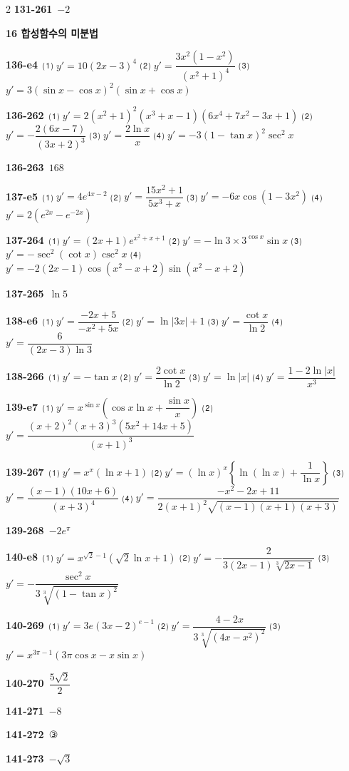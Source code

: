 \documentclass[10pt,a4paper]{article}
\begin{document}
\begin{multicols}{2}
\noindent\textbf{131-261}\ $-2$\par
\noindent\textbf{16 합성함수의 미분법}\par\smallskip
\noindent\textbf{136-e4}\ ⑴ $y'=10(2x-3)^4$ ⑵ $y'=\dfrac{3x^2(1-x^2)}{(x^2+1)^4}$ ⑶ $y'=3(\sin x-\cos x)^2(\sin x+\cos x)$\par
\noindent\textbf{136-262}\ ⑴ $y'=2(x^2+1)^2(x^3+x-1)(6x^4+7x^2-3x+1)$ ⑵ $y'=-\dfrac{2(6x-7)}{(3x+2)^3}$ ⑶ $y'=\dfrac{2\ln x}{x}$ ⑷ $y'=-3(1-\tan x)^2\sec^2 x$\par
\noindent\textbf{136-263}\ $168$\par
\noindent\textbf{137-e5}\ ⑴ $y'=4e^{4x-2}$ ⑵ $y'=\dfrac{15x^2+1}{5x^3+x}$ ⑶ $y'=-6x\cos(1-3x^2)$ ⑷ $y'=2(e^{2x}-e^{-2x})$\par
\noindent\textbf{137-264}\ ⑴ $y'=(2x+1)e^{x^2+x+1}$ ⑵ $y'=-\ln 3\times 3^{\cos x}\sin x$ ⑶ $y'=-\sec^2(\cot x)\csc^2 x$ ⑷ $y'=-2(2x-1)\cos(x^2-x+2)\sin(x^2-x+2)$\par
\noindent\textbf{137-265}\ $\ln 5$\par
\noindent\textbf{138-e6}\ ⑴ $y'=\dfrac{-2x+5}{-x^2+5x}$ ⑵ $y'=\ln|3x|+1$ ⑶ $y'=\dfrac{\cot x}{\ln 2}$ ⑷ $y'=\dfrac{6}{(2x-3)\ln 3}$\par
\noindent\textbf{138-266}\ ⑴ $y'=-\tan x$ ⑵ $y'=\dfrac{2\cot x}{\ln 2}$ ⑶ $y'=\ln|x|$ ⑷ $y'=\dfrac{1-2\ln|x|}{x^3}$\par
\noindent\textbf{139-e7}\ ⑴ $y'=x^{\sin x}\left(\cos x\ln x+\dfrac{\sin x}{x}\right)$ ⑵ $y'=\dfrac{(x+2)^2(x+3)^3(5x^2+14x+5)}{(x+1)^3}$\par
\noindent\textbf{139-267}\ ⑴ $y'=x^x(\ln x+1)$ ⑵ $y'=(\ln x)^x\left\{\ln(\ln x)+\dfrac{1}{\ln x}\right\}$ ⑶ $y'=\dfrac{(x-1)(10x+6)}{(x+3)^4}$ ⑷ $y'=\dfrac{-x^2-2x+11}{2(x+1)^2\sqrt{(x-1)(x+1)(x+3)}}$\par
\noindent\textbf{139-268}\ $-2e^{\pi}$\par
\noindent\textbf{140-e8}\ ⑴ $y'=x^{\sqrt{2}-1}(\sqrt{2}\ln x+1)$ ⑵ $y'=-\dfrac{2}{3(2x-1)\sqrt[3]{2x-1}}$ ⑶ $y'=-\dfrac{\sec^2 x}{3\sqrt[3]{(1-\tan x)^2}}$\par
\noindent\textbf{140-269}\ ⑴ $y'=3e(3x-2)^{e-1}$ ⑵ $y'=\dfrac{4-2x}{3\sqrt[3]{(4x-x^2)^2}}$ ⑶ $y'=x^{3\pi-1}(3\pi\cos x-x\sin x)$\par
\noindent\textbf{140-270}\ $\dfrac{5\sqrt{2}}{2}$\par
\noindent\textbf{141-271}\ $-8$\par
\noindent\textbf{141-272}\ ③\par
\noindent\textbf{141-273}\ $-\sqrt{3}$\par

\end{multicols}
\end{document}

